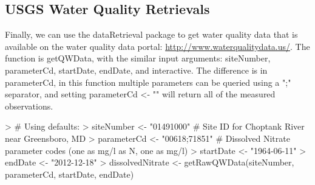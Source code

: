 \documentclass[a4paper,11pt]{article}
\begin{document}
\subsection{USGS Water Quality Retrievals}
Finally, we can use the dataRetrieval package to get water quality data that is available on the water quality data portal: \url{http://www.waterqualitydata.us/}. The function is getQWData, with the similar input arguments: siteNumber, parameterCd, startDate, endDate, and interactive. The difference is in parameterCd, in this function multiple parameters can be queried using a ";" separator, and setting parameterCd <- "" will return all of the measured observations.

\begin{Schunk}
\begin{Sinput}
> # Using defaults:
> siteNumber <- "01491000" # Site ID for Choptank River near Greensboro, MD
> parameterCd <- "00618;71851"  # Dissolved Nitrate parameter codes (one as mg/l as N, one as mg/l)
> startDate <- "1964-06-11"
> endDate <- "2012-12-18"
> dissolvedNitrate <- getRawQWData(siteNumber, parameterCd, startDate, endDate)
\end{Sinput}
\end{Schunk}
\end{document}
